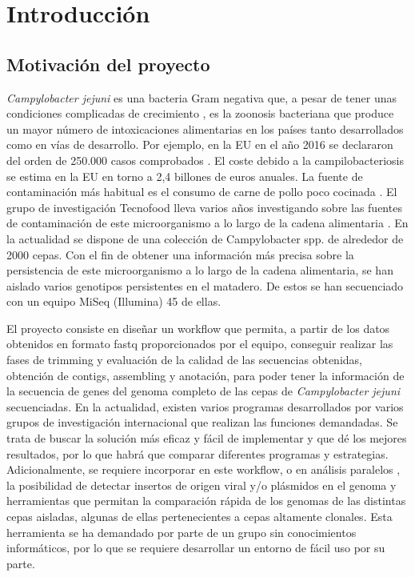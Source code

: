 \chapter{Introducción} 
\label{chap:intro}

\vspace{-0.2cm}

\section{Motivación del proyecto}
\textit{Campylobacter jejuni} es una bacteria Gram negativa que, a pesar de tener unas condiciones complicadas de crecimiento \cite{garciasanchez2017}, es la zoonosis bacteriana que produce un mayor número de intoxicaciones alimentarias en los países tanto desarrollados como en vías de desarrollo. Por ejemplo, en la EU en el año 2016 se declararon del orden de 250.000 casos comprobados \cite{report2016}. El coste debido a la campilobacteriosis se estima en la EU en torno a 2,4 billones de euros anuales. La fuente de contaminación más habitual es el consumo de carne de pollo poco cocinada \cite{GarciaSanchez2018}. El grupo de investigación Tecnofood lleva varios años investigando sobre las fuentes de contaminación de este microorganismo a lo largo de la cadena alimentaria \cite{garciasanchez2017, GarciaSanchez2018, Melero2012}. En la actualidad se dispone de una colección de Campylobacter spp. de alrededor de 2000 cepas. Con el fin de obtener una información más precisa sobre la persistencia de este microorganismo a lo largo de la cadena alimentaria, se han aislado varios genotipos persistentes en el matadero. De estos se han secuenciado con un equipo MiSeq (Illumina) 45 de ellas.

El proyecto consiste en diseñar un workflow que permita, a partir de los datos obtenidos en formato fastq proporcionados por el equipo, conseguir realizar las fases de trimming y evaluación de la calidad de las secuencias obtenidas, obtención de contigs, assembling y anotación, para poder tener la información de la secuencia de genes del genoma completo  \cite{Clark2016, Llarena2017, Zhao2016} de las cepas de \textit{Campylobacter jejuni} secuenciadas. En la actualidad, existen varios programas desarrollados por varios grupos de investigación internacional que realizan las funciones demandadas. Se trata de buscar la solución más eficaz y fácil de implementar y que dé los mejores resultados, por lo que habrá que comparar diferentes programas y estrategias. Adicionalmente, se requiere incorporar en este workflow, o en análisis paralelos \cite{Skarp2015}, la posibilidad de detectar insertos de origen viral y/o plásmidos en el genoma y herramientas que permitan la comparación rápida de los genomas de las distintas cepas aisladas, algunas de ellas pertenecientes a cepas altamente clonales. Esta herramienta se ha demandado por parte de un grupo sin conocimientos informáticos, por lo que se requiere desarrollar un entorno de fácil uso por su parte.

